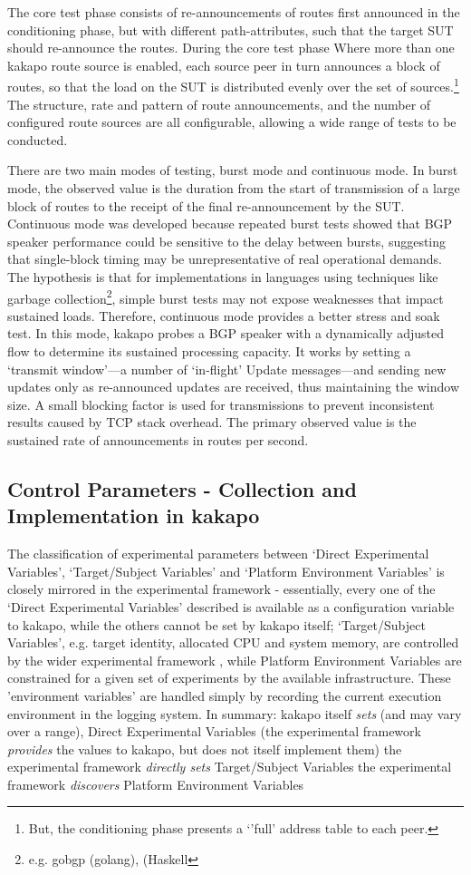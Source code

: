 The core test phase consists of re-announcements of routes first announced in the conditioning phase, but with different path-attributes, such that the target SUT should re-announce the routes.
During the core test phase Where more than one kakapo route source is enabled, each source peer in turn announces a block of routes, so that the load on the SUT is distributed evenly over the set of sources.\footnote{But, the conditioning phase presents a `'full' address table to each peer.}
The structure, rate and pattern of route announcements, and the number of configured route sources are all configurable, allowing a wide range of tests to be conducted.

There are two main modes of testing, burst mode and continuous mode.
In burst mode, the observed value is the duration from the start of transmission of a large block of routes to the receipt of the final re-announcement by the SUT.
Continuous mode was developed because repeated burst tests showed that BGP speaker performance could be sensitive to the delay between bursts, suggesting that single-block timing may be unrepresentative of real operational demands.
The hypothesis is that for implementations in languages using techniques like garbage collection\footnote{e.g. gobgp (golang), \hbgp (Haskell}, simple burst tests may not expose weaknesses that impact sustained loads.
Therefore, continuous mode provides a better stress and soak test.
In this mode, kakapo probes a BGP speaker with a dynamically adjusted flow to determine its sustained processing capacity.
It works by setting a `transmit window'—a number of ‘in-flight’ Update messages—and sending new updates only as re-announced updates are received, thus maintaining the window size.
A small blocking factor is used for transmissions to prevent inconsistent results caused by TCP stack overhead.
The primary observed value is the sustained rate of announcements in routes per second.


\subsection{Control Parameters - Collection and Implementation in kakapo}
The classification of experimental parameters between `Direct Experimental Variables', `Target/Subject Variables' and `Platform Environment Variables' is closely mirrored in the experimental framework - essentially, every one of the `Direct Experimental Variables' described is available as a configuration variable to kakapo, while the others cannot be set by kakapo itself; `Target/Subject Variables', e.g. target identity, allocated CPU and system memory, are controlled by the wider experimental framework , while Platform Environment Variables are constrained for a given set of experiments by the available infrastructure.
These 'environment variables' are handled simply by recording the current execution environment in the logging system.
In summary: kakapo itself \textit{sets} (and may vary over a range), Direct Experimental Variables  (the experimental framework \textit{provides} the values to kakapo, but does not itself implement them) the experimental framework \textit{directly sets} Target/Subject Variables the experimental framework \textit{discovers} Platform Environment Variables

